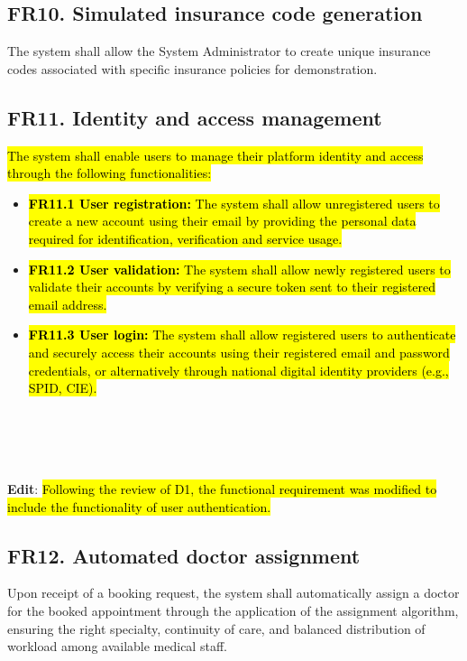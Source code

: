 \documentclass[12pt, a4paper]{article}
\begin{document}
\subsection{FR10. Simulated insurance code generation} \label{FR10} 
The system shall allow the System Administrator to create unique insurance codes associated with specific insurance policies for demonstration.
\\ 

\subsection{FR11. Identity and access management} \label{FR11}
\hl{The system shall enable users to manage their platform identity and access through the following functionalities:}

\begin{itemize}
    \item \hl{\textbf{FR11.1 User registration:} The system shall allow unregistered users to create a new account using their email by providing the personal data required for identification, verification and service usage.}
    \item \hl{\textbf{FR11.2 User validation:} The system shall allow newly registered users to validate their accounts by verifying a secure token sent to their registered email address.}
    \item \hl{\textbf{FR11.3 User login:} The system shall allow registered users to authenticate and securely access their accounts using their registered email and password credentials, or alternatively through national digital identity providers (e.g., SPID, CIE).}
\end{itemize}
 \\
 \\
\\
\\ \textbf{Edit}:
\hl{Following the review of D1, the functional requirement was modified to include the functionality of user authentication.}

\subsection{FR12. Automated doctor assignment} \label{FR12}
Upon receipt of a booking request, the system shall automatically assign a doctor for the booked appointment through the application of the assignment algorithm, ensuring the right specialty, continuity of care, and balanced distribution of workload among available medical staff.
\\ 
\\ 
\\ 
\end{document}
